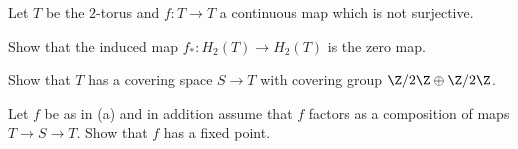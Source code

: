 Let $T$ be the $2$-torus and $f:T\rightarrow T$ a continuous map which
is not surjective.
\begin{alist}
\item Show that the induced map $f_*:H_2(T)\rightarrow H_2(T)$ is the
zero map.
\item Show that $T$ has a covering space $S\rightarrow T$ 
with covering group $\Z/2\Z\oplus\Z/2\Z$.
\item Let $f$ be as in (a) and in addition assume that $f$ factors  
as a composition of maps $T\rightarrow S\rightarrow T$. Show that $f$
has a fixed point.
\end{alist}
